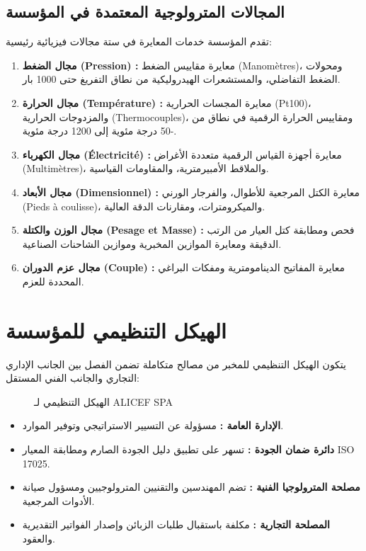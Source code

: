 \documentclass{bts-report-ar}
\begin{document}
\subsection{المجالات المترولوجية المعتمدة في المؤسسة}
تقدم المؤسسة خدمات المعايرة في ستة مجالات فيزيائية رئيسية:
\begin{enumerate}
  \item \textbf{مجال الضغط (Pression) :} معايرة مقاييس الضغط (Manomètres)، ومحولات الضغط التفاضلي، والمستشعرات الهيدروليكية من نطاق التفريغ حتى 1000 بار.
  \item \textbf{مجال الحرارة (Température) :} معايرة المجسات الحرارية (Pt100)، والمزدوجات الحرارية (Thermocouples)، ومقاييس الحرارة الرقمية في نطاق من -50 درجة مئوية إلى 1200 درجة مئوية.
  \item \textbf{مجال الكهرباء (Électricité) :} معايرة أجهزة القياس الرقمية متعددة الأغراض (Multimètres)، والملاقط الأمبيرمترية، والمقاومات القياسية.
  \item \textbf{مجال الأبعاد (Dimensionnel) :} معايرة الكتل المرجعية للأطوال، والفرجار الورني (Pieds à coulisse)، والميكرومترات، ومقارنات الدقة العالية.
  \item \textbf{مجال الوزن والكتلة (Pesage et Masse) :} فحص ومطابقة كتل العيار من الرتب الدقيقة ومعايرة الموازين المخبرية وموازين الشاحنات الصناعية.
  \item \textbf{مجال عزم الدوران (Couple) :} معايرة المفاتيح الدينامومترية ومفكات البراغي المحددة للعزم.
\end{enumerate}

\section{الهيكل التنظيمي للمؤسسة}
يتكون الهيكل التنظيمي للمخبر من مصالح متكاملة تضمن الفصل بين الجانب الإداري التجاري والجانب الفني المستقل:

\begin{figure}[H]
  \centering
  \begin{LTR}
  
  \end{LTR}
  \caption{الهيكل التنظيمي لـ ALICEF SPA}
  \label{fig:org-chart}
\end{figure}

\begin{itemize}
  \item \textbf{الإدارة العامة :} مسؤولة عن التسيير الاستراتيجي وتوفير الموارد.
  \item \textbf{دائرة ضمان الجودة :} تسهر على تطبيق دليل الجودة الصارم ومطابقة المعيار ISO 17025.
  \item \textbf{مصلحة المترولوجيا الفنية :} تضم المهندسين والتقنيين المترولوجيين ومسؤول صيانة الأدوات المرجعية.
  \item \textbf{المصلحة التجارية :} مكلفة باستقبال طلبات الزبائن وإصدار الفواتير التقديرية والعقود.
\end{itemize}
\end{document}
